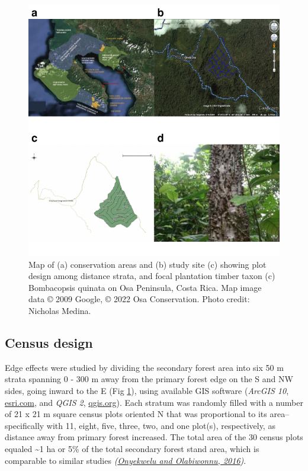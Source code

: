 \documentclass[
  12pt,
]{article}
\begin{document}
\begin{figure}
\centering
\includegraphics{merge_files/figure-latex/map-1.pdf}
\caption{\label{fig:map}Map of (a) conservation areas and (b) study site (c) showing plot design among distance strata, and focal plantation timber taxon (c) Bombacopsis quinata on Osa Peninsula, Costa Rica. Map image data © 2009 Google, © 2022 Osa Conservation. Photo credit: Nicholas Medina.}
\end{figure}

\hypertarget{census-design}{%
\subsection{Census design}\label{census-design}}

Edge effects were studied by dividing the secondary forest area into six 50 m strata spanning 0 - 300 m away from the primary forest edge on the S and NW sides, going inward to the E (Fig \ref{fig:map}), using available GIS software (\emph{ArcGIS 10}, \url{esri.com}, and \emph{QGIS 2}, \url{qgis.org}).
Each stratum was randomly filled with a number of 21 x 21 m square census plots oriented N that was proportional to its area--specifically with 11, eight, five, three, two, and one plot(s), respectively, as distance away from primary forest increased.
The total area of the 30 census plots equaled \textasciitilde1 ha or 5\% of the total secondary forest stand area, which is comparable to similar studies \emph{(\protect\hyperlink{ref-onyekwelu16}{Onyekwelu and Olabiwonnu, 2016})}.
\end{document}
